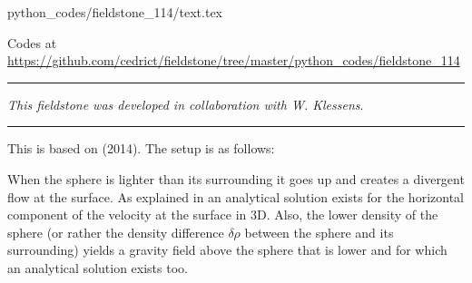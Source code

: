 \begin{flushright} {\tiny {\color{gray} python\_codes/fieldstone\_114/text.tex}} \end{flushright}

%

\begin{center}
Codes at \url{https://github.com/cedrict/fieldstone/tree/master/python_codes/fieldstone_114}
\end{center}

\par\noindent\rule{\textwidth}{0.4pt}

{\sl This fieldstone was developed in collaboration with W. Klessens}. 

\par\noindent\rule{\textwidth}{0.4pt}

This \stone is based on \textcite{bakp14} (2014).
The setup is as follows:

\begin{center}
\end{center}

When the sphere is lighter than its surrounding it goes up and creates a 
divergent flow at the surface. As explained in \cite{bakp14} an analytical 
solution exists for the horizontal component of the velocity at the surface in 3D. 
Also, the lower density of the sphere (or rather the density difference $\delta\rho$
between the sphere and its surrounding) yields a gravity field 
above the sphere that is lower and for which an analytical solution exists too.


